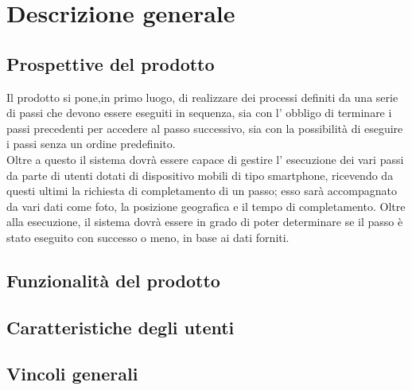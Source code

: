 \section{Descrizione generale}
\subsection{Prospettive del prodotto}
Il prodotto si pone,in primo luogo, di realizzare dei processi definiti da una serie
di passi che devono essere eseguiti in sequenza, sia con l' obbligo di terminare i passi precedenti
per accedere al passo successivo, sia con la possibilità di eseguire i passi senza
un ordine predefinito.\\
Oltre a questo il sistema dovrà essere capace di gestire l' esecuzione dei vari passi da parte di
utenti dotati di dispositivo mobili di tipo smartphone, ricevendo da questi ultimi la
richiesta di completamento di un passo; esso sarà accompagnato da vari dati come foto, la posizione geografica e il tempo di completamento. Oltre alla esecuzione, il sistema dovrà essere in grado di poter determinare se il passo è stato eseguito con successo o meno, in base ai dati forniti. 
\subsection{Funzionalità del prodotto}
\subsection{Caratteristiche degli utenti}
\subsection{Vincoli generali}
